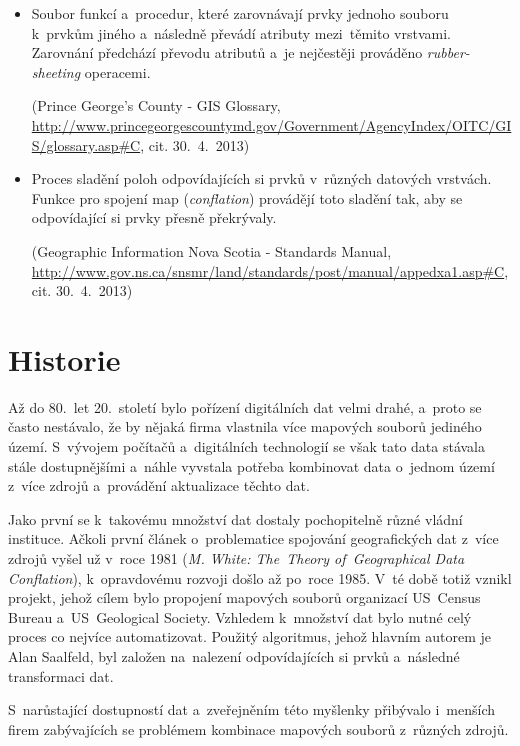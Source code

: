 \begin{itemize}
  \item Soubor funkcí a~procedur, které zarovnávají prvky jednoho  
    souboru k~prvkům jiného a~následně převádí atributy mezi~těmito vrstvami.
    Zarovnání předchází převodu atributů a~je nejčestěji prováděno 
    \textit{rubber-sheeting} operacemi.
   
    (Prince George's County - GIS Glossary,
    \url{http://www.princegeorgescountymd.gov/Government/AgencyIndex/OITC/GIS/glossary.asp#C},
    cit. 30.~4.~2013)

  \item Proces sladění poloh odpovídajících si prvků v~různých datových 
    vrstvách. Funkce pro spojení map (\textit{conflation}) provádějí toto 
    sladění tak, aby se odpovídající si prvky přesně překrývaly. 
    
    (Geographic Information Nova Scotia - Standards Manual,
    \url{http://www.gov.ns.ca/snsmr/land/standards/post/manual/appedxa1.asp#C},
     cit. 30.~4.~2013)

\end{itemize}

\section{Historie}
\label{historie}

Až do 80.~let 20.~století bylo pořízení digitálních dat velmi drahé, a~proto 
se často nestávalo, že by nějaká firma vlastnila více mapových souborů jediného 
území. S~vývojem počítačů a~digitálních technologií se však tato data stávala 
stále dostupnějšími a~náhle vyvstala potřeba kombinovat data o~jednom území 
z~více zdrojů a~provádění aktualizace těchto dat. 

Jako první se k~takovému množství dat dostaly pochopitelně různé vládní 
instituce. Ačkoli první článek o~problematice spojování geografických dat 
z~více zdrojů vyšel už v~roce 1981 (\textit{M. White: The~Theory of~Geographical
Data Conflation}), k~opravdovému rozvoji došlo až po~roce 1985. V~té době 
totiž vznikl projekt, jehož cílem bylo propojení mapových souborů organizací
US~Census Bureau a~US~Geological Society. Vzhledem k~množství dat bylo nutné
celý proces co nejvíce auto\-matizovat. Použitý algoritmus, jehož hlavním autorem
je Alan Saalfeld, byl založen na~nalezení odpovídajících si prvků a~následné 
transformaci dat. 

S~narůstající dostupností dat a~zveřejněním této myšlenky přibývalo i~menších 
firem zabývajících se problémem kombinace mapových souborů z~různých zdrojů.

